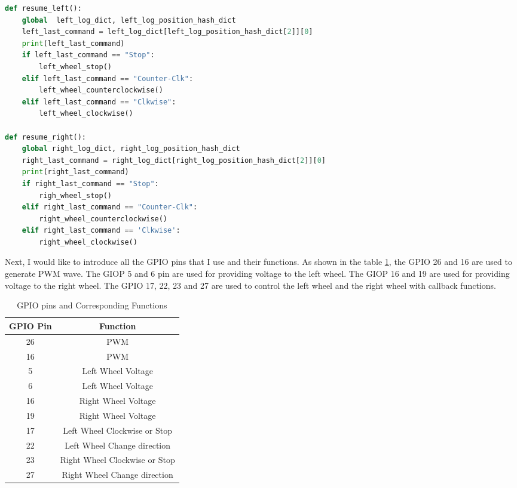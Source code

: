 \documentclass[12pt]{report}
\begin{document}
\begin{center}
\begin{lstlisting}[language=Python, label=code:code6, caption= Resume Functions] 
def resume_left():
    global  left_log_dict, left_log_position_hash_dict
    left_last_command = left_log_dict[left_log_position_hash_dict[2]][0]
    print(left_last_command)
    if left_last_command == "Stop":
        left_wheel_stop()
    elif left_last_command == "Counter-Clk":
        left_wheel_counterclockwise()
    elif left_last_command == "Clkwise":
        left_wheel_clockwise()

def resume_right():
    global right_log_dict, right_log_position_hash_dict
    right_last_command = right_log_dict[right_log_position_hash_dict[2]][0]
    print(right_last_command)
    if right_last_command == "Stop":
        righ_wheel_stop()
    elif right_last_command == "Counter-Clk":
        right_wheel_counterclockwise()
    elif right_last_command == 'Clkwise':
        right_wheel_clockwise()
\end{lstlisting}
\end{center}\vspace{-2em}
Next, I would like to introduce all the GPIO pins that I use and their functions. As shown in the table \ref{table: table1}, the GPIO 26 and 16 are used to generate PWM wave. The GIOP 5 and 6 pin are used for providing voltage to the left wheel. The GIOP 16 and 19 are used for providing voltage to the right wheel. The GPIO 17, 22, 23 and 27 are used to control the left wheel and the right wheel with callback functions. \vspace{-2em}
\begin{table}[H]
\centering
 \caption{GPIO pins and Corresponding Functions}
 \label{table: table1}
 \begin{tabular}{|c| c |} 
 \hline
 GPIO Pin & Function  \\ [0.5ex] 
 \hline
 26 & PWM  \\ 
 \hline
 16 & PWM \\
 \hline
 5 & Left Wheel Voltage \\
 \hline
 6 & Left Wheel Voltage \\
 \hline
  16 & Right Wheel Voltage \\
 \hline
  19 & Right Wheel Voltage \\
 \hline
 17 & Left Wheel Clockwise or Stop \\
 \hline
 22 & Left Wheel Change direction \\
 \hline
 23 & Right Wheel Clockwise or Stop\\
 \hline
27 & Right Wheel Change direction  \\ 
 \hline
 \end{tabular}
\end{table}\vspace{-2em}
\end{document}
